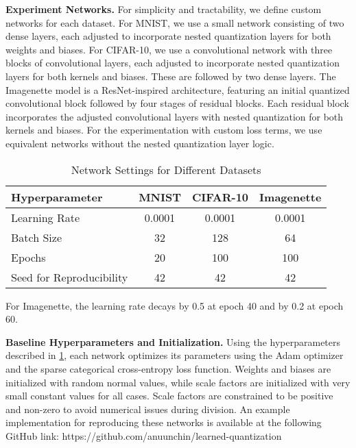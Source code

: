 \textbf{Experiment Networks.} 
For simplicity and tractability, we define custom networks for each dataset.
For MNIST, we use a small network consisting of two dense layers, 
each adjusted to incorporate nested quantization layers for both weights and biases. 
For CIFAR-10, we use a convolutional network with three blocks of convolutional layers, 
each adjusted to incorporate nested quantization layers for both kernels and biases.
These are followed by two dense layers.
The Imagenette model is a ResNet-inspired architecture,
featuring an initial quantized convolutional block followed by four stages of residual blocks. 
Each residual block incorporates the adjusted convolutional layers with nested quantization 
for both kernels and biases. For the experimentation with custom loss terms, 
we use equivalent networks without the nested quantization layer logic.
\begin{table}[b!]
  \centering
  \caption{Network Settings for Different Datasets}
  \label{tab:hyperparameters}
  \begin{tabular}{lccc}
      \toprule
      \textbf{Hyperparameter}     & \textbf{MNIST} & \textbf{CIFAR-10} & \textbf{Imagenette} \\ 
      \midrule
      Learning Rate               & 0.0001            & 0.0001              & 0.0001\footnotemark[1]           \\ 
      Batch Size                  & 32                & 128                 & 64                 \\ 
      Epochs                      & 20               & 100                 & 100                \\ 
      Seed for Reproducibility   & 42               & 42                  & 42                \\ 
      \bottomrule
  \end{tabular}
  \vspace{1.0em}
  \begin{center}
    \parbox{0.86\textwidth}{\footnotesize\footnotemark[1] For Imagenette, the learning rate decays by 0.5 at epoch 40 and by 0.2 at epoch 60.}
  \end{center}
\end{table}


\textbf{Baseline Hyperparameters and Initialization.} Using the hyperparameters described in \cref{tab:hyperparameters}, 
each network optimizes its parameters using the Adam optimizer and the sparse categorical cross-entropy loss function. 
Weights and biases are initialized with random normal values, 
while scale factors are initialized with very small constant values for all cases. 
Scale factors are constrained to be positive and non-zero to avoid numerical issues during division. 
An example implementation for reproducing these networks is available at the following GitHub link: https://github.com/anuunchin/learned-quantization


